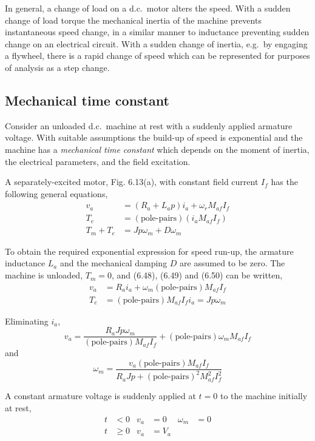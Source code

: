 \documentclass[a4paper,numbers=noenddot,12pt]{scrbook}
\begin{document}
In general, a change of load on a d.c.\ motor alters the speed. With a sudden change of load torque the mechanical inertia of the machine prevents instantaneous speed change, in a similar manner to inductance preventing sudden change on an electrical circuit. With a sudden change of inertia, e.g.\ by engaging a flywheel, there is a rapid change of speed which can be represented for purposes of analysis as a step change.

\subsection{Mechanical time constant} Consider an unloaded d.c.\ machine at rest with a suddenly applied armature voltage. With suitable assumptions the build-up of speed is exponential and the machine has a \textit{mechanical time constant} which depends on the moment of inertia, the electrical parameters, and the field excitation.

A separately-excited motor, Fig. 6.13(a), with constant field current $I_f$ has the following general equations,
\begin{align}
    v_a & = (R_a + L_a p)i_a + \omega_r M_{af} I_f \\
    T_e & = (\text{pole-pairs})(i_a M_{af} I_f) \\
    T_m + T_e & = J p \omega_m + D \omega_m  
    \label{}
\end{align}

To obtain the required exponential expression for speed run-up, the armature inductance $L_a$ and the mechanical damping $D$ are assumed to be zero. The machine is unloaded, $T_m = 0$, and (6.48), (6.49) and (6.50) can be written,
\begin{align}
    v_a & = R_a i_a + \omega_m (\text{pole-pairs}) M_{af} I_f \\
    T_e & = (\text{pole-pairs})M_{af} I_f i_a = J p \omega_m
    \label{}
\end{align}

Eliminating $i_a$,
\begin{equation}
    v_a = \dfrac{R_a J p \omega_m}{(\text{pole-pairs}) M_{af} I_f} + (\text{pole-pairs}) \omega_m M_{af} I_f
    \label{}
\end{equation}
and
\begin{equation}
    \omega_m = \dfrac{v_a (\text{pole-pairs}) M_{af} I_f}{R_a J p + {(\text{pole-pairs})}^2 M_{af}^2 I_f^2}
    \label{}
\end{equation}

A constant armature voltage is suddenly applied at $t = 0$ to the machine initially at rest,
\begin{align*}
    t & < 0 & v_a & = 0 & \omega_m & = 0\\
    t & \ge 0 & v_a & = V_a
\end{align*}
\end{document}
